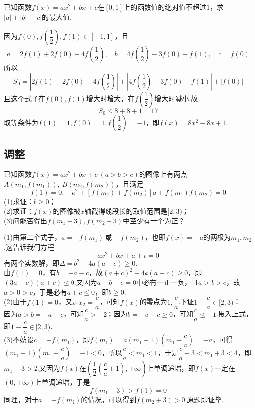 \documentclass[cn,hazy,black,10pt,normal]{elegantnote}
\newcommand{\ssb}[1]{\left( #1 \right)}
\begin{document}
\begin{problem} %
	已知函数$f(x)=ax^2+bx+c$在$[0,1]$上的函数值的绝对值不超过$1$，求$|a|+|b|+|c|$的最大值.
\end{problem}
\begin{solution}
	因为$f(0),f\ssb{\dfrac{1}{2}},f(1) \in [-1,1]$，且$$a = 2f(1)+2f(0)-4f\ssb{\frac{1}{2}},\quad b = 4f\ssb{\frac{1}{2}}-3f(0)-f(1),\quad c=f(0)$$
	所以$$S_0 = |2f(1)+2f(0)-4f\ssb{\frac{1}{2}}| + |4f\ssb{\frac{1}{2}}-3f(0)-f(1)| + |f(0)|$$
	且这个式子在$f(0),f(1)$增大时增大，在$f\ssb{\dfrac{1}{2}}$增大时减小.故$$S_0 \leq 8+8+1=17$$
	取等条件为$f(1)=1,f(0)=1,f\ssb{\dfrac{1}{2}}=-1$，即$f(x)=8x^2-8x+1$.
\end{solution}

\subsection{调整}



\begin{problem} %
	已知函数$f(x)=ax^2+bx+c~(a>b>c)$的图像上有两点$A(m_1,f(m_1)),~B(m_2,f(m_2))$，且满足$$f(1)=0,\quad a^2+[f(m_1)+f(m_2)]a+f(m_1)f(m_2)=0$$
	(1)求证：$b\geq 0$； \\
	(2)求证：$f(x)$的图像被$x$轴截得线段长的取值范围是$[2,3)$； \\
	(3)问能否得出$f(m_1+3),f(m_2+3)$中至少有一个为正？
\end{problem}
\begin{solution}
	(1)由第二个式子，$a=-f(m_1)~\textit{或}-f(m_2)$，也即$f(x)=-a$的两根为$m_1,m_2$.这告诉我们方程$$ax^2+bx+a+c=0$$有两个实数解，即$\Delta = b^2-4a(a+c) \geq 0$. \\
	由$f(1)=0$，有$b=-a-c$，故$(a+c)^2-4a(a+c) \geq 0$，即$(3a-c)(a+c) \leq 0$.又因为$a+b+c=0$中必有一正一负，且$a>b>c$，故$a>0>c$，于是必有$a+c \leq 0$，即$b \geq 0$. \\
	(2)由于$f(1)=0$，又$x_1x_2=\dfrac{c}{a}$，可知$f(x)$的零点为$1,\dfrac{c}{a}$.下证$1-\dfrac{c}{a} \in [2,3)$：\\
	因为$a>b=-a-c$，可知$\dfrac{c}{a} > -2$；因为$b=-a-c \geq 0$，可知$\dfrac{c}{a} \leq -1$.带入上式，即$1-\dfrac{c}{a} \in [2,3)$. \\
	(3)不妨设$a=-f(m_1)$，即$f(m_1) = a(m_1-1)(m_1-\dfrac{c}{a}) = -a$，可得$(m_1-1)(m_1-\dfrac{c}{a}) = -1 <0$，所以$\dfrac{c}{a} < m_1 < 1$，于是$\dfrac{c}{a}+3<m_1+3<4$，即$m_1+3>2$.又因为$f(x)$在$\ssb{\dfrac{1}{2}\ssb{\dfrac{c}{a}+1},+\infty}$上单调递增，即$f(x)$一定在$(0,+\infty)$上单调递增，于是$$f(m_1+3) > f(1) = 0$$
	同理，对于$a=-f(m_2)$的情况，可以得到$f(m_2+3)>0$.原题即证毕.
\end{solution}
\end{document}
